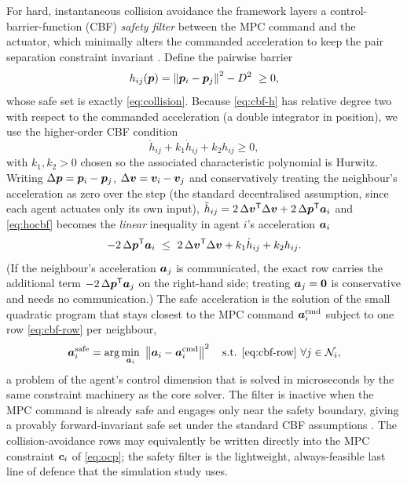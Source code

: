 For hard, instantaneous collision avoidance the framework layers a
control-barrier-function (CBF) \emph{safety filter} between the MPC command and
the actuator, which minimally alters the commanded acceleration to keep the pair
separation constraint invariant \cite{ames2017control,wang2017safety}. Define the
pairwise barrier
\begin{equation}
h_{ij}(\vv{p})=\norm{\vv{p}_i-\vv{p}_j}^2-D^2\ \ge0,
\label{eq:cbf-h}
\end{equation}
whose safe set is exactly \cref{eq:collision}. Because \cref{eq:cbf-h} has
relative degree two with respect to the commanded acceleration (a double
integrator in position), we use the higher-order CBF condition
\begin{equation}
\ddot h_{ij}+k_1\dot h_{ij}+k_2 h_{ij}\ge0,
\label{eq:hocbf}
\end{equation}
with $k_1,k_2>0$ chosen so the associated characteristic polynomial is Hurwitz.
Writing $\Delta\bm{p}=\bm{p}_i-\bm{p}_j$, $\Delta\bm{v}=\bm{v}_i-\bm{v}_j$ and
conservatively treating the neighbour's acceleration as zero over the step (the
standard decentralised assumption, since each agent actuates only its own input),
$\ddot h_{ij}=2\,\Delta\bm{v}^{\mathsf{T}}\Delta\bm{v}+2\,\Delta\bm{p}^{\mathsf{T}}\bm{a}_i$ and
\cref{eq:hocbf} becomes the \emph{linear} inequality in agent $i$'s acceleration
$\bm{a}_i$
\begin{equation}
-2\,\Delta\vv{p}\T\vv{a}_i\ \le\ 2\,\Delta\vv{v}\T\Delta\vv{v}+k_1\dot h_{ij}+k_2 h_{ij}.
\label{eq:cbf-row}
\end{equation}
(If the neighbour's acceleration $\bm{a}_j$ is communicated, the exact row carries
the additional term $-2\,\Delta\bm{p}^{\mathsf{T}}\bm{a}_j$ on the right-hand side; treating
$\bm{a}_j=\bm{0}$ is conservative and needs no communication.)
The safe acceleration is the solution of the small quadratic program that stays
closest to the MPC command $\bm{a}_i^{\text{cmd}}$ subject to one row
\cref{eq:cbf-row} per neighbour,
\begin{equation}
\vv{a}_i^{\text{safe}}=\arg\min_{\vv{a}_i}\ \norm{\vv{a}_i-\vv{a}_i^{\text{cmd}}}^2
\quad\text{s.t. \cref{eq:cbf-row}}\ \forall j\in\Neigh_i,
\label{eq:cbf-qp}
\end{equation}
a problem of the agent's control dimension that is solved in microseconds by the
same constraint machinery as the core solver. The filter is inactive when the
MPC command is already safe and engages only near the safety boundary, giving a
provably forward-invariant safe set under the standard CBF assumptions
\cite{ames2017control}. The collision-avoidance rows may equivalently be written
directly into the MPC constraint $\bm{c}_i$ of \cref{eq:ocp}; the safety filter is
the lightweight, always-feasible last line of defence that the simulation study
uses.

